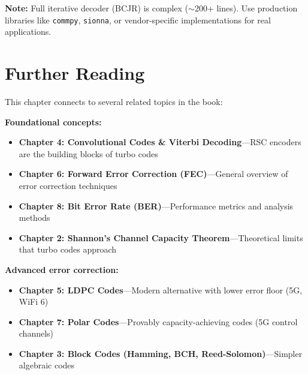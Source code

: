 \begin{Shaded}
\begin{Highlighting}[]
\NormalTok{(}\SpecialCharTok{\{}\SpecialCharTok{\}}\NormalTok{)}
\NormalTok{(}\SpecialCharTok{\{}\SpecialCharTok{\}}\NormalTok{)}
\NormalTok{(}\SpecialCharTok{\{}\SpecialCharTok{\}}\NormalTok{)}
\NormalTok{(}\SpecialCharTok{\{}\SpecialCharTok{\}}\NormalTok{)}
\NormalTok{(}\SpecialCharTok{\{}\SpecialCharTok{\}}\SpecialStringTok{/}\SpecialCharTok{\{}\OperatorTok{+}\OperatorTok{+}\SpecialCharTok{\}}\NormalTok{)}
\end{Highlighting}
\end{Shaded}

\textbf{Note:} Full iterative decoder (BCJR) is complex ($\sim$200+ lines). Use production libraries like \texttt{commpy}, \texttt{sionna}, or vendor-specific implementations for real applications.

\section{Further Reading}

This chapter connects to several related topics in the book:

\textbf{Foundational concepts:}
\begin{itemize}
\item \textbf{Chapter 4: Convolutional Codes \& Viterbi Decoding}---RSC encoders are the building blocks of turbo codes
\item \textbf{Chapter 6: Forward Error Correction (FEC)}---General overview of error correction techniques
\item \textbf{Chapter 8: Bit Error Rate (BER)}---Performance metrics and analysis methods
\item \textbf{Chapter 2: Shannon's Channel Capacity Theorem}---Theoretical limits that turbo codes approach
\end{itemize}

\textbf{Advanced error correction:}
\begin{itemize}
\item \textbf{Chapter 5: LDPC Codes}---Modern alternative with lower error floor (5G, WiFi 6)
\item \textbf{Chapter 7: Polar Codes}---Provably capacity-achieving codes (5G control channels)
\item \textbf{Chapter 3: Block Codes (Hamming, BCH, Reed-Solomon)}---Simpler algebraic codes
\end{itemize}

